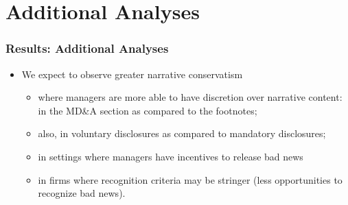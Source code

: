 \documentclass{beamer}
\begin{document}
\section{Additional Analyses}
\begin{frame}
\frametitle{Results: Additional Analyses}
\begin{itemize}
	\item We expect to observe greater narrative conservatism
	\begin{itemize}
		\item where managers are more able to have discretion over narrative content: in the MD\&A section as compared to the footnotes;
		\item also, in voluntary disclosures as compared to mandatory disclosures;
		\item in settings where managers have incentives to release bad news
		\item in firms where recognition criteria may be stringer (less opportunities to recognize bad news).
	\end{itemize}
\end{itemize}
\end{frame}
\end{document}
